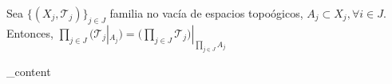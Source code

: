 \begin{ejr}[33]
  Sea $\{ ( X_{j}, \mathcal{T}_{j} ) \}_{j \in J}$ familia no vacía de espacios topoógicos, $A_{j} \subset X_{j}, \forall i \in J$. Entonces, $\prod_{j \in J} \big ( \mathcal{T}_{j}|_{A_{j}} \big ) = \big ( \prod_{j \in J} \mathcal{T}_{j} \big )|_{\prod_{j \in J} A_{j}}$
\end{ejr}

\begin{sol}
  _content
\end{sol}
